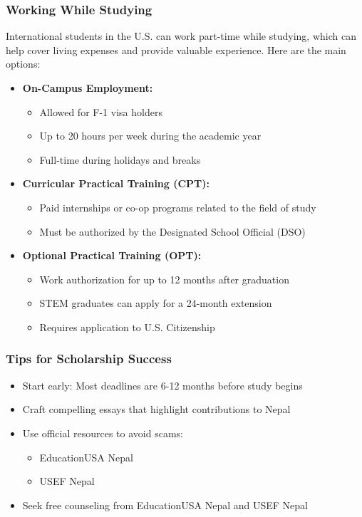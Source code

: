 \subsubsection{Working While Studying}
International students in the U.S. can work part-time while studying, which can help cover living expenses and provide valuable experience. Here are the main options:
\begin{itemize}
    \item \textbf{On-Campus Employment:}
    \begin{itemize}
        \item Allowed for F-1 visa holders
        \item Up to 20 hours per week during the academic year
        \item Full-time during holidays and breaks
    \end{itemize}

    \item \textbf{Curricular Practical Training (CPT):}
    \begin{itemize}
        \item Paid internships or co-op programs related to the field of study
        \item Must be authorized by the Designated School Official (DSO)
    \end{itemize}

    \item \textbf{Optional Practical Training (OPT):}
    \begin{itemize}
        \item Work authorization for up to 12 months after graduation
        \item STEM graduates can apply for a 24-month extension
        \item Requires application to U.S. Citizenship
    \end{itemize}
\end{itemize}    

\subsubsection{Tips for Scholarship Success}
\begin{itemize}
    \item Start early: Most deadlines are 6-12 months before study begins
    \item Craft compelling essays that highlight contributions to Nepal
    \item Use official resources to avoid scams:
    \begin{itemize}
        \item EducationUSA Nepal
        \item USEF Nepal
    \end{itemize}
    \item Seek free counseling from EducationUSA Nepal and USEF Nepal
\end{itemize}

